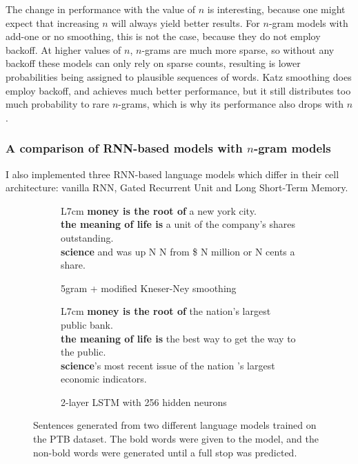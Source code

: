 \documentclass[a4paper, 12pt]{report}
\newcommand{\tbf}[1]{\textbf{#1}}
\begin{document}
The change in performance with the value of $n$ is interesting, because one might expect that increasing $n$ will always yield better results. For $n$-gram models with add-one or no smoothing, this is not the case, because they do not employ backoff. At higher values of $n$, $n$-grams are much more sparse, so without any backoff these models can only rely on sparse counts, resulting is lower probabilities being assigned to plausible sequences of words. Katz smoothing does employ backoff, and achieves much better performance, but it still distributes too much probability to rare $n$-grams, which is why its performance also drops with $n$.

\subsubsection*{A comparison of RNN-based models with $n$-gram models}

I also implemented three RNN-based language models which differ in their cell architecture: vanilla RNN, Gated Recurrent Unit and Long Short-Term Memory. \\

\begin{figure}[h]
\captionsetup{justification=centering}
\centering
\begin{subfigure}{0.5\linewidth}
	\centering
	\begin{tabular}{L{7cm}}
		\hline
		\tbf{money is the root of} a new york city. \\ \hline
		\tbf{the meaning of life is} a unit of the company's shares outstanding. \\ \hline
		\tbf{science} and was up N N from \$ N million or N cents a share. \\ \hline
	\end{tabular}
	\caption{5gram + modified Kneser-Ney smoothing}
\end{subfigure}%
\begin{subfigure}{0.5\linewidth}
	\centering
	\begin{tabular}{L{7cm}}
		\hline
		\tbf{money is the root of} the nation's largest public bank. \\ \hline
		\tbf{the meaning of life is} the best way to get the way to the public. \\ \hline
		\tbf{science}'s most recent issue of the nation 's largest economic indicators. \\ \hline
	\end{tabular}
	\caption{2-layer LSTM with 256 hidden neurons}
\end{subfigure}
\caption{Sentences generated from two different language models trained on the PTB dataset. The bold words were given to the model, and the non-bold words were generated until a full stop was predicted.}
\label{fig:generated_sentences}
\end{figure}
\end{document}
